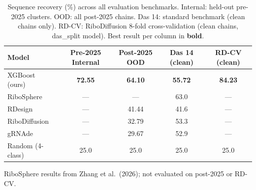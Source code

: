 \begin{table}[t]
\centering
\caption{Sequence recovery (\%) across all evaluation benchmarks. Internal: held-out pre-2025 clusters. OOD: all post-2025 chains. Das 14: standard benchmark (clean chains only). RD-CV: RiboDiffusion 8-fold cross-validation (clean chains, das\_split model). Best result per column in \textbf{bold}.}
\label{tab:main_results}
\begin{tabular}{lcccc}
\toprule
\bfseries Model & \bfseries Pre-2025 Internal & \bfseries Post-2025 OOD & \bfseries Das 14 (clean) & \bfseries RD-CV (clean) \\
\midrule
XGBoost (ours) & \bf{72.55} & \bf{64.10} & \bf{55.72} & \bf{84.23} \\
RiboSphere\tnote{*} & --- & --- & 63.0 & --- \\
RDesign & --- & 41.44 & 41.6 & --- \\
RiboDiffusion & --- & 32.79 & 53.3 & --- \\
gRNAde & --- & 29.67 & 52.9 & --- \\
Random (4-class) & 25.0 & 25.0 & 25.0 & 25.0 \\
\bottomrule
\end{tabular}
\begin{tablenotes}
\item[*] RiboSphere results from Zhang et al.\ (2026); not evaluated on post-2025 or RD-CV.
\end{tablenotes}
\end{table}


